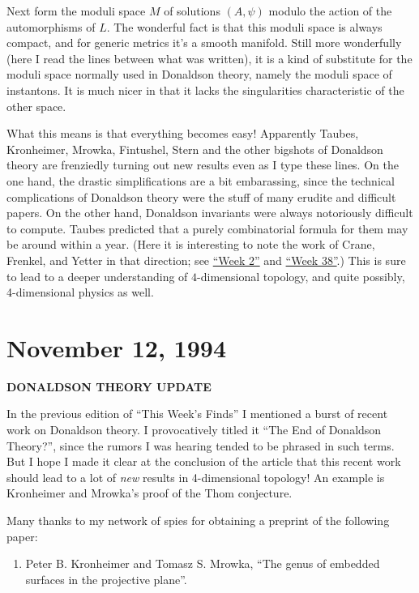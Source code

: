 \documentclass{article}
\def\tightlist{}
\begin{document}
Next form the moduli space \(M\) of solutions \((A, \psi)\) modulo the
action of the automorphisms of \(L\). The wonderful fact is that this
moduli space is always compact, and for generic metrics it's a smooth
manifold. Still more wonderfully (here I read the lines between what was
written), it is a kind of substitute for the moduli space normally used
in Donaldson theory, namely the moduli space of instantons. It is much
nicer in that it lacks the singularities characteristic of the other
space.

What this means is that everything becomes easy! Apparently Taubes,
Kronheimer, Mrowka, Fintushel, Stern and the other bigshots of Donaldson
theory are frenziedly turning out new results even as I type these
lines. On the one hand, the drastic simplifications are a bit
embarassing, since the technical complications of Donaldson theory were
the stuff of many erudite and difficult papers. On the other hand,
Donaldson invariants were always notoriously difficult to compute.
Taubes predicted that a purely combinatorial formula for them may be
around within a year. (Here it is interesting to note the work of Crane,
Frenkel, and Yetter in that direction; see
\protect\hyperlink{week2}{``Week 2''} and
\protect\hyperlink{week38}{``Week 38''}.) This is sure to lead to a
deeper understanding of \(4\)-dimensional topology, and quite possibly,
4-dimensional physics as well.



\hypertarget{week45}{%
\section{November 12, 1994}\label{week45}}

\begin{center}
\textbf{DONALDSON THEORY UPDATE}
\end{center}

In the previous edition of ``This Week's Finds'' I mentioned a burst of
recent work on Donaldson theory. I provocatively titled it ``The End of
Donaldson Theory?'', since the rumors I was hearing tended to be phrased
in such terms. But I hope I made it clear at the conclusion of the
article that this recent work should lead to a lot of \emph{new} results
in 4-dimensional topology! An example is Kronheimer and Mrowka's proof
of the Thom conjecture.

Many thanks to my network of spies for obtaining a preprint of the
following paper:

\begin{enumerate}
\def\labelenumi{\arabic{enumi})}
\tightlist
\item
  Peter B. Kronheimer and Tomasz S. Mrowka, ``The genus of 
  embedded surfaces in the projective plane''.
\end{enumerate}
\end{document}
